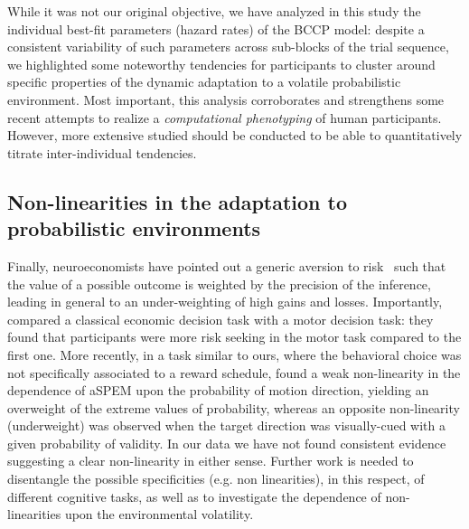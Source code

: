 \documentclass[12pt,english]{article}%
\newcommand{\citep}[1]{\parencite{#1}}
\newcommand{\citet}[1]{\textcite{#1}}
\begin{document}
While it was not our original objective, we have analyzed in this study the individual best-fit parameters (hazard rates) of the BCCP model: despite a consistent variability of such parameters across sub-blocks of the trial sequence, we highlighted some noteworthy tendencies for participants to cluster around specific properties of the dynamic adaptation to a volatile probabilistic environment. Most important, this analysis corroborates and strengthens some recent attempts to realize a \textit{computational phenotyping} of human participants. However, more extensive studied should be conducted to be able to quantitatively titrate inter-individual tendencies.

\subsection{Non-linearities in the adaptation to probabilistic environments}
Finally, neuroeconomists have pointed out a generic aversion to risk~\citep{Kahneman13}
such that the value of a possible outcome
is weighted by the precision of the inference, leading in general to an under-weighting of high gains and losses. Importantly,~\citet{WuDelgadoMaloney2012} compared a classical economic decision task with a motor decision task: they found that participants were more risk seeking in the motor task compared to the first one. More recently, in a task similar to ours, where the behavioral choice was not specifically associated to a reward schedule,
\citet{SantosKowler2017} found a weak non-linearity in the dependence of aSPEM upon the probability of motion direction, yielding an overweight of the extreme values of probability, whereas an opposite non-linearity (underweight) was observed when the target direction was visually-cued with a given probability of validity. In our data we have not found consistent evidence suggesting a clear non-linearity in either sense. Further work is needed to disentangle the possible specificities (e.g. non linearities), in this respect, of different cognitive tasks, as well as to investigate the dependence of non-linearities upon the environmental volatility.
\end{document}
